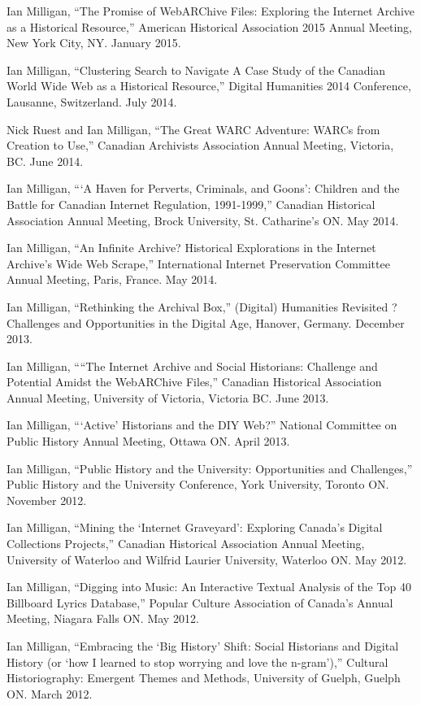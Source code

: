 \documentclass[11pt,article,oneside]{memoir}
\begin{document}
\ind Ian Milligan, ``The Promise of WebARChive Files: Exploring the Internet Archive as a Historical Resource,'' American Historical Association 2015 Annual Meeting, New York City, NY. January 2015.

\ind Ian Milligan, ``Clustering Search to Navigate A Case Study of the Canadian World Wide Web as a Historical Resource,'' Digital Humanities 2014 Conference, Lausanne, Switzerland. July 2014.

\ind Nick Ruest and Ian Milligan, ``The Great WARC Adventure: WARCs from Creation to Use,'' Canadian Archivists Association Annual Meeting, Victoria, BC. June 2014.

\ind Ian Milligan, ```A Haven for Perverts, Criminals, and Goons': Children and the Battle for Canadian Internet Regulation, 1991-1999,'' Canadian Historical Association Annual Meeting, Brock University, St. Catharine's ON. May 2014.

\ind Ian Milligan, ``An Infinite Archive? Historical Explorations in the Internet Archive's Wide Web Scrape,'' International Internet Preservation Committee Annual Meeting, Paris, France. May 2014. 

\ind Ian Milligan, ``Rethinking the Archival Box,'' (Digital) Humanities Revisited ? Challenges and Opportunities in the Digital Age, Hanover, Germany. December 2013.

\ind Ian Milligan, ````The Internet Archive and Social Historians: Challenge and Potential Amidst the WebARChive Files,'' Canadian Historical Association Annual Meeting, University of Victoria, Victoria BC. June 2013. 

\ind Ian Milligan, ```Active' Historians and the DIY Web?'' National Committee on Public History Annual Meeting, Ottawa ON. April 2013.

\ind Ian Milligan, ``Public History and the University: Opportunities and Challenges,'' Public History and the University Conference, York University, Toronto ON. November 2012. 

\ind Ian Milligan, ``Mining the `Internet Graveyard': Exploring Canada's Digital Collections Projects,'' Canadian Historical Association Annual Meeting, University of Waterloo and Wilfrid Laurier University, Waterloo ON. May 2012. 

\ind Ian Milligan, ``Digging into Music: An Interactive Textual Analysis of the Top 40 Billboard Lyrics Database,'' Popular Culture Association of Canada's Annual Meeting, Niagara Falls ON. May 2012. 

\ind Ian Milligan, ``Embracing the `Big History' Shift: Social Historians and Digital History (or `how I learned to stop worrying and love the n-gram'),'' Cultural Historiography: Emergent Themes and Methods, University of Guelph, Guelph ON. March 2012.
\end{document}
